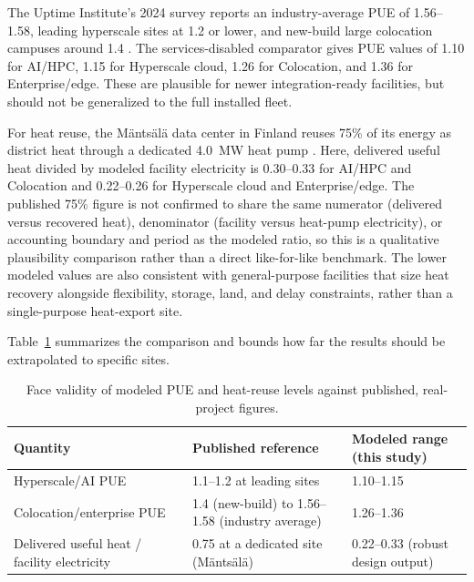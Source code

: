 \documentclass[preprint,12pt]{elsarticle}
\begin{document}
The Uptime Institute's 2024 survey reports an industry-average PUE of 1.56--1.58, leading hyperscale sites at 1.2 or lower, and new-build large colocation campuses around 1.4 \cite{UptimeInstitute2024Survey}. The services-disabled comparator gives PUE values of 1.10 for AI/HPC, 1.15 for Hyperscale cloud, 1.26 for Colocation, and 1.36 for Enterprise/edge. These are plausible for newer integration-ready facilities, but should not be generalized to the full installed fleet.

For heat reuse, the M\"ants\"al\"a data center in Finland reuses 75\% of its energy as district heat through a dedicated 4.0~MW heat pump \cite{EUSmartCities2024Mantsala}. Here, delivered useful heat divided by modeled facility electricity is 0.30--0.33 for AI/HPC and Colocation and 0.22--0.26 for Hyperscale cloud and Enterprise/edge. The published 75\% figure is not confirmed to share the same numerator (delivered versus recovered heat), denominator (facility versus heat-pump electricity), or accounting boundary and period as the modeled ratio, so this is a qualitative plausibility comparison rather than a direct like-for-like benchmark. The lower modeled values are also consistent with general-purpose facilities that size heat recovery alongside flexibility, storage, land, and delay constraints, rather than a single-purpose heat-export site.

Table~\ref{tab:face-validity} summarizes the comparison and bounds how far the results should be extrapolated to specific sites.

\begin{table}[H]
\centering
\small
\caption{Face validity of modeled PUE and heat-reuse levels against published, real-project figures.}
\label{tab:face-validity}
\begin{tabularx}{\linewidth}{l X X}
\toprule
Quantity & Published reference & Modeled range (this study) \\
\midrule
Hyperscale/AI PUE & 1.1--1.2 at leading sites \cite{UptimeInstitute2024Survey} & 1.10--1.15 \\
Colocation/enterprise PUE & 1.4 (new-build) to 1.56--1.58 (industry average) \cite{UptimeInstitute2024Survey} & 1.26--1.36 \\
Delivered useful heat / facility electricity & 0.75 at a dedicated site (M\"ants\"al\"a) \cite{EUSmartCities2024Mantsala} & 0.22--0.33 (robust design output) \\
\bottomrule
\end{tabularx}
\end{table}
\end{document}
